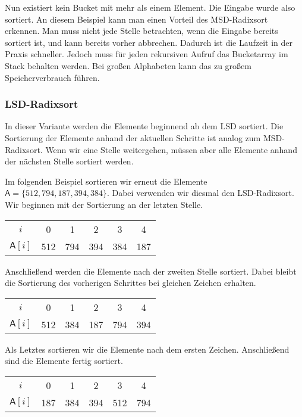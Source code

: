 Nun existiert kein Bucket mit mehr als einem Element. Die Eingabe wurde also sortiert.
An diesem Beispiel kann man einen Vorteil des MSD-Radixsort erkennen.
Man muss nicht jede Stelle betrachten, wenn die Eingabe bereits sortiert ist, und kann bereits vorher abbrechen.
Dadurch ist die Laufzeit in der Praxis schneller.
Jedoch muss für jeden rekursiven Aufruf das Bucketarray im Stack behalten werden.
Bei großen Alphabeten kann das zu großem Speicherverbrauch führen.

\subsubsection{LSD-Radixsort}
\label{sort:radix:lsd}

In dieser Variante werden die Elemente beginnend ab dem LSD sortiert.
Die Sortierung der Elemente anhand der aktuellen Schritte ist analog zum MSD-Radixsort.
Wenn wir eine Stelle weitergehen, müssen aber alle Elemente anhand der nächsten Stelle sortiert werden.

Im folgenden Beispiel sortieren wir erneut die Elemente $\mathsf{A}=\{512, 794, 187, 394, 384\}$.
Dabei verwenden wir diesmal den LSD-Radixsort.
Wir beginnen mit der Sortierung an der letzten Stelle.

\begin{table}[H]
	\centering
	\begin{tabular}{c|| c | c c c | c }
		$i$ & 0 & 1 & 2 & 3 & 4 \\
		$\mathsf{A}[i]$ & 512 & 794 & 394 & 384 & 187
	\end{tabular}
	\label{tab:radix:lsd:step_1}
\end{table}

Anschließend werden die Elemente nach der zweiten Stelle sortiert.
Dabei bleibt die Sortierung des vorherigen Schrittes bei gleichen Zeichen erhalten.

\begin{table}[H]
	\centering
	\begin{tabular}{c|| c | c c | c c }
		$i$ & 0 & 1 & 2 & 3 & 4 \\
		$\mathsf{A}[i]$ & 512 & 384 & 187 & 794 & 394
	\end{tabular}
	\label{tab:radix:lsd:step_2}
\end{table}

Als Letztes sortieren wir die Elemente nach dem ersten Zeichen.
Anschließend sind die Elemente fertig sortiert.

\begin{table}[H]
	\centering
	\begin{tabular}{c|| c | c c | c | c }
		$i$ & 0 & 1 & 2 & 3 & 4 \\
		$\mathsf{A}[i]$ & 187 & 384 & 394 & 512 & 794
	\end{tabular}
	\label{tab:radix:lsd:step_3}
\end{table}

